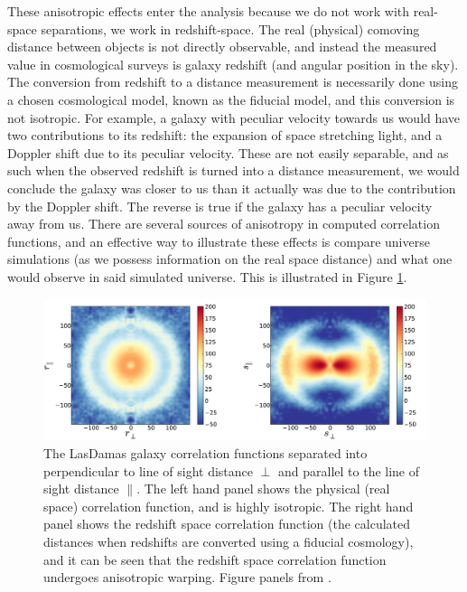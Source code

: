 \documentclass[titlesmallcaps, examinerscopy, copyrightpage]{uqthesis}
\begin{document}
These anisotropic effects enter the analysis because we do not work with real-space separations, we work in redshift-space. The real (physical) comoving distance between objects is not directly observable, and instead the measured value in cosmological surveys is galaxy redshift (and angular position in the sky). The conversion from redshift to a distance measurement is necessarily done using a chosen cosmological model, known as the fiducial model, and this conversion is not isotropic. For example, a galaxy with peculiar velocity towards us would have two contributions to its redshift: the expansion of space stretching light, and a Doppler shift due to its peculiar velocity. These are not easily separable, and as such when the observed redshift is turned into a distance measurement, we would conclude the galaxy was closer to us than it actually was due to the contribution by the Doppler shift. The reverse is true if the galaxy has a peculiar velocity away from us. There are several sources of anisotropy in computed correlation functions, and an effective way to illustrate these effects is compare universe simulations (as we possess information on the real space distance) and what one would observe in said simulated universe. This is illustrated  in Figure \ref{fig:ani}.\\

\begin{figure}[h!]
  \begin{center}
    \includegraphics[width=\textwidth]{images/anisotropies.jpg}
  \end{center}
  \caption{The LasDamas galaxy correlation functions separated into perpendicular to line of sight distance $\perp$ and parallel to the line of sight distance $\parallel$. The left hand panel shows the physical (real space) correlation function, and is highly isotropic. The right hand panel shows the redshift space correlation function (the calculated distances when redshifts are converted using a fiducial cosmology), and it can be seen that the redshift space correlation function undergoes anisotropic warping. Figure panels from \citet{PadmanabhanXuEisenstein2012}.}
  \label{fig:ani}
\end{figure}
\end{document}

